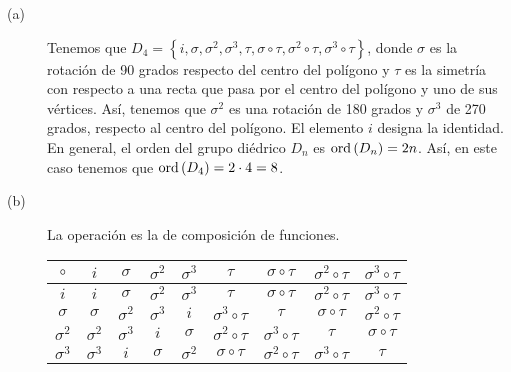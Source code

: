 \documentclass{article}
\begin{document}
\begin{sol}
\begin{description}
	\item[(a)] Tenemos que $\displaystyle D_{4} = \left\{ i , \sigma, \sigma^{2}, \sigma^{3}, \tau, \sigma \circ \tau, \sigma^{2}\circ \tau, \sigma^{3}\circ \tau\right\}  $, donde $\displaystyle \sigma  $ es la rotación de 90 grados respecto del centro del polígono y $\displaystyle \tau $ es la simetría con respecto a una recta que pasa por el centro del polígono y uno de sus vértices. Así, tenemos que $\displaystyle \sigma^{2} $ es una rotación de 180 grados y $\displaystyle \sigma ^{3} $ de 270 grados, respecto al centro del polígono. El elemento $\displaystyle i $ designa la identidad. 
En general, el orden del grupo diédrico $\displaystyle D_{n} $ es $\displaystyle \operatorname{ord}\left(D_{n}\right) = 2n $. Así, en este caso tenemos que $\displaystyle \operatorname{ord}\left(D_{4}\right) = 2 \cdot 4 = 8 $.
\item[(b)] La operación es la de composición de funciones.
	\begin{center}
	\begin{tabular}{c | c | c | c | c | c | c | c | c |}
		$\displaystyle \circ $ & $\displaystyle i $ & $\displaystyle \sigma  $ & $\displaystyle \sigma^{2} $ & $\displaystyle \sigma^{3} $ & $\displaystyle \tau $ & $\displaystyle \sigma \circ \tau $ & $\displaystyle \sigma^{2} \circ \tau  $ & $\displaystyle \sigma^{3} \circ \tau $ \\
		\hline 
		$\displaystyle i $ & $\displaystyle i $ & $\displaystyle \sigma $ & $\displaystyle \sigma^{2} $ & $\displaystyle \sigma^{3} $ & $\displaystyle \tau $ & $\displaystyle \sigma \circ \tau $ & $\displaystyle \sigma^{2} \circ \tau  $ & $\displaystyle \sigma^{3} \circ \tau $ \\
		$\displaystyle \sigma  $ & $\displaystyle \sigma  $ & $\displaystyle \sigma^{2} $ & $\displaystyle \sigma^{3} $ & $\displaystyle i $ & $\displaystyle \sigma^{3} \circ \tau  $ & $\displaystyle \tau $ & $\displaystyle \sigma \circ \tau  $ & $\displaystyle \sigma^{2}\circ \tau $ \\
		$\displaystyle \sigma^{2} $ & $\displaystyle \sigma^{2} $ & $\displaystyle \sigma^{3} $ & $\displaystyle i $ & $\displaystyle \sigma  $ & $\displaystyle \sigma^{2} \circ \tau $ & $\displaystyle \sigma^{3} \circ \tau $ & $\displaystyle \tau $ & $\displaystyle \sigma\circ\tau $ \\
		$\displaystyle \sigma^{3}  $ & $\displaystyle \sigma^{3} $ & $\displaystyle i $ & $\displaystyle \sigma  $ & $\displaystyle \sigma ^{2} $ & $\displaystyle \sigma \circ \tau $ & $\displaystyle \sigma^{2} \circ \tau $ & $\displaystyle \sigma^{3} \circ \tau $ & $\displaystyle \tau $\\

\end{tabular}
\end{center}
\end{description}
\end{sol}
\end{document}
